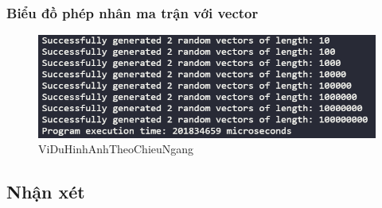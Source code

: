  



\newpage
\subsubsection{Biểu đồ phép nhân ma trận với vector}


\begin{figure}[h] %
    \centering
    \includegraphics[width=1\textwidth]{pictures/image.png} %
    \caption{ViDuHinhAnhTheoChieuNgang} %
    \label{pictures:nghia12} %
\end{figure}


\subsection{Nhận xét}
\lipsum[1]


